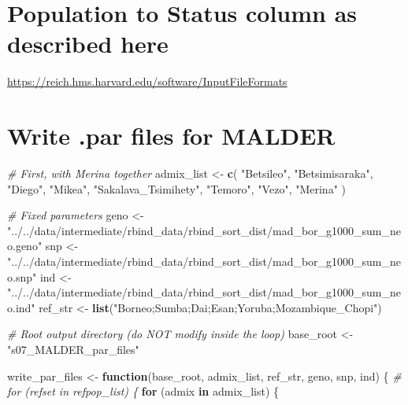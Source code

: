 \documentclass[
]{article}
\newenvironment{Shaded}{\begin{snugshade}}{\end{snugshade}}
\newcommand{\CommentTok}[1]{\textcolor[rgb]{0.56,0.35,0.01}{\textit{#1}}}
\newcommand{\ControlFlowTok}[1]{\textcolor[rgb]{0.13,0.29,0.53}{\textbf{#1}}}
\newcommand{\FunctionTok}[1]{\textcolor[rgb]{0.13,0.29,0.53}{\textbf{#1}}}
\newcommand{\NormalTok}[1]{#1}
\newcommand{\OtherTok}[1]{\textcolor[rgb]{0.56,0.35,0.01}{#1}}
\newcommand{\StringTok}[1]{\textcolor[rgb]{0.31,0.60,0.02}{#1}}
\begin{document}
\section{Population to Status column as described
here}\label{population-to-status-column-as-described-here}

\url{https://reich.hms.harvard.edu/software/InputFileFormats}

\section{Write .par files for MALDER}\label{write-.par-files-for-malder}

\begin{Shaded}
\begin{Highlighting}[]
\CommentTok{\# First, with Merina together}
\NormalTok{admix\_list }\OtherTok{\textless{}{-}} \FunctionTok{c}\NormalTok{(}
  \StringTok{"Betsileo"}\NormalTok{, }\StringTok{"Betsimisaraka"}\NormalTok{, }\StringTok{"Diego"}\NormalTok{, }\StringTok{"Mikea"}\NormalTok{,}
  \StringTok{"Sakalava\_Tsimihety"}\NormalTok{, }\StringTok{"Temoro"}\NormalTok{, }\StringTok{"Vezo"}\NormalTok{, }\StringTok{"Merina"}
\NormalTok{)}

\CommentTok{\# Fixed parameters}
\NormalTok{geno }\OtherTok{\textless{}{-}}
  \StringTok{"../../data/intermediate/rbind\_data/rbind\_sort\_dist/mad\_bor\_g1000\_sum\_neo.geno"}
\NormalTok{snp }\OtherTok{\textless{}{-}}
  \StringTok{"../../data/intermediate/rbind\_data/rbind\_sort\_dist/mad\_bor\_g1000\_sum\_neo.snp"}
\NormalTok{ind }\OtherTok{\textless{}{-}}
  \StringTok{"../../data/intermediate/rbind\_data/rbind\_sort\_dist/mad\_bor\_g1000\_sum\_neo.ind"}
\NormalTok{ref\_str }\OtherTok{\textless{}{-}} \FunctionTok{list}\NormalTok{(}\StringTok{"Borneo;Sumba;Dai;Esan;Yoruba;Mozambique\_Chopi"}\NormalTok{)}

\CommentTok{\# Root output directory (do NOT modify inside the loop)}
\NormalTok{base\_root }\OtherTok{\textless{}{-}} \StringTok{"s07\_MALDER\_par\_files"}

\NormalTok{write\_par\_files }\OtherTok{\textless{}{-}} \ControlFlowTok{function}\NormalTok{(base\_root,}
\NormalTok{                            admix\_list,}
\NormalTok{                            ref\_str,}
\NormalTok{                            geno,}
\NormalTok{                            snp,}
\NormalTok{                            ind) \{}
  \CommentTok{\# for (refset in refpop\_list) \{}
  \ControlFlowTok{for}\NormalTok{ (admix }\ControlFlowTok{in}\NormalTok{ admix\_list) \{}


\end{Highlighting}
\end{Shaded}
\end{document}
